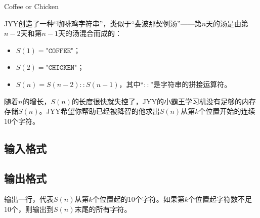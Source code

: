 \begin{Problem}{Coffee or Chicken}{}

JYY创造了一种“咖啡鸡字符串”，类似于“斐波那契例汤”——第$n$天的汤是由第$n-2$天和第$n-1$天的汤混合而成的：

\begin{itemize}
  \item $S(1) = \texttt{"COFFEE"}$；
  \item $S(2) = \texttt{"CHICKEN"}$；
  \item $S(n) = S(n - 2) :: S(n - 1)$，其中“$::$”是字符串的拼接运算符。
\end{itemize}

随着$n$的增长，$S(n)$的长度很快就失控了，JYY的小霸王学习机没有足够的内存存储$S(n)$。JYY希望你帮助已经被降智的他求出$S(n)$从第$k$个位置开始的连续10个字符。

\subsection*{输入格式}


\subsection*{输出格式}

输出一行，代表$S(n)$从第$k$个位置起的10个字符。如果第$k$个位置起字符数不足10个，则输出到$S(n)$末尾的所有字符。


\end{Problem}
